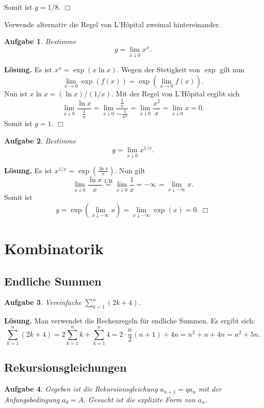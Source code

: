 \documentclass[a4paper,10pt,fleqn,twoside]{scrartcl}
\numberwithin{equation}{section}
\newcommand{\strong}[1]{{\sf\bfseries #1}}
\theoremstyle{Aufgabe}
\newtheorem{Aufgabe}{\sffamily Aufgabe}[section]
\begin{document}
Somit ist $g=1/8$. $\Box$

Verwende alternativ die Regel von L'Hôpital zweimal hintereinander.

\begin{Aufgabe}
Bestimme
\[g=\lim_{x\downarrow 0} x^x.\]
\end{Aufgabe}
\noindent
\strong{Lösung.} Es ist $x^x=\exp(x\ln x)$. Wegen der Stetigkeit von $\exp$
gilt nun
\[\lim_{x\to 0}\exp(f(x)) = \exp(\lim_{x\to 0} f(x)).\]
Nun ist $x\ln x = (\ln x)/(1/x).$
Mit der Regel von L'Hôpital ergibt sich
\[\lim_{x\downarrow 0} \frac{\ln x}{\frac{1}{x}}
= \lim_{x\downarrow 0} \frac{\frac{1}{x}}{-\frac{1}{x^2}}
= \lim_{x\downarrow 0}\frac{x^2}{x}
= \lim_{x\downarrow 0} x = 0.\]
Somit ist $g=1$. $\Box$

\begin{Aufgabe}
Bestimme
\[g=\lim_{x\downarrow 0} x^{1/x}.\]
\end{Aufgabe}
\noindent
\strong{Lösung.} Es ist $x^{1/x}=\exp(\frac{\ln x}{x})$.
Nun gilt
\[\lim_{x\downarrow 0}\frac{\ln x}{x}
\stackrel{\text{L'H}}= \lim_{x\downarrow 0}\frac{1}{x}
= -\infty = \lim_{x\downarrow -\infty} x.\]
Somit ist
\[g = \exp(\lim_{x\downarrow -\infty} x)
= \lim_{x\downarrow -\infty} \exp(x) = 0.\;\Box\]

\section{Kombinatorik}
\subsection{Endliche Summen}
\begin{Aufgabe}
Vereinfache $\displaystyle\sum_{k=1}^n (2k+4)$.
\end{Aufgabe}

\noindent
\strong{Lösung.} Man verwendet die Rechenregeln für endliche Summen.
Es ergibt sich:
\begin{equation}
\sum_{k=1}^n (2k+4) = 2\sum_{k=1}^n k + \sum_{k=1}^n 4
= 2\cdot\frac{n}{2}(n+1)+4n = n^2+n+4n = n^2+5n.
\end{equation}

\subsection{Rekursionsgleichungen}

\begin{Aufgabe}\label{qPotenzen}
Gegeben ist die Rekursionsgleichung $a_{n+1} = qa_n$
mit der Anfangsbedingung $a_0=A.$
Gesucht ist die explizite Form von $a_n$.
\end{Aufgabe}
\end{document}

